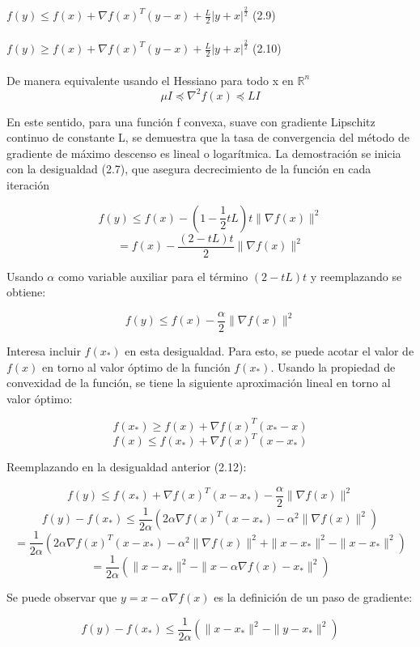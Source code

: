\documentclass[conference]{IEEEtran}
\begin{document}
\(f(y) \leq f(x) + \nabla f(x)^T(y - x) + \frac{L}{2}\lvert y+x \rvert^\frac{2}{2} \) (2.9)\\\\
\(f(y) \geq f(x) + \nabla f(x)^T(y - x) + \frac{L}{2}\lvert y+x \rvert^\frac{2}{2} \) (2.10)\\\\
De manera equivalente usando el Hessiano para todo x en \( \mathbb{R}^n\)
\[
\mu I \preccurlyeq \nabla^2 f(x) \preccurlyeq L I \tag{(2.11)}
\]

En este sentido, para una función f convexa, suave con gradiente Lipschitz continuo de constante L, se demuestra que la tasa de convergencia del método de gradiente de máximo descenso es lineal o logarítmica.
La demostración se inicia con la desigualdad (2.7), que asegura decrecimiento de la función en cada iteración

\[
f(y) \leq f(x) - \left(1 - \frac{1}{2} t L\right) t \| \nabla f(x) \|^2
\]
\[
= f(x) - \frac{(2 - t L)t}{2} \| \nabla f(x) \|^2
\]

Usando \(\alpha\) como variable auxiliar para el término \((2 - t L)t\) y reemplazando se obtiene:

\[
f(y) \leq f(x) - \frac{\alpha}{2} \| \nabla f(x) \|^2 \tag{(2.12)}
\]

Interesa incluir \(f(x_*)\) en esta desigualdad. Para esto, se puede acotar el valor de \(f(x)\) en torno al valor óptimo de la función \(f(x_*)\). Usando la propiedad de convexidad de la función, se tiene la siguiente aproximación lineal en torno al valor óptimo:

\[
f(x_*) \geq f(x) + \nabla f(x)^T (x_* - x)
\]
\[
f(x) \leq f(x_*) + \nabla f(x)^T (x - x_*)
\]

Reemplazando en la desigualdad anterior (2.12):

\[
f(y) \leq f(x_*) + \nabla f(x)^T (x - x_*) - \frac{\alpha}{2} \| \nabla f(x) \|^2
\]
\[
f(y) - f(x_*) \leq \frac{1}{2\alpha} \left( 2\alpha \nabla f(x)^T (x - x_*) - \alpha^2 \| \nabla f(x) \|^2 \right)
\]
\[
= \frac{1}{2\alpha} \left( 2\alpha \nabla f(x)^T (x - x_*) - \alpha^2 \| \nabla f(x) \|^2 + \| x - x_* \|^2 - \| x - x_* \|^2 \right)
\]
\[
= \frac{1}{2\alpha} \left( \| x - x_* \|^2 - \| x - \alpha \nabla f(x) - x_* \|^2 \right)
\]

Se puede observar que \( y = x - \alpha \nabla f(x) \) es la definición de un paso de gradiente:

\[
f(y) - f(x_{*}) \leq \frac{1}{2\alpha} \left( \|x - x_{*}\|^{2} - \|y - x_{*}\|^{2} \right)
\]
\end{document}
